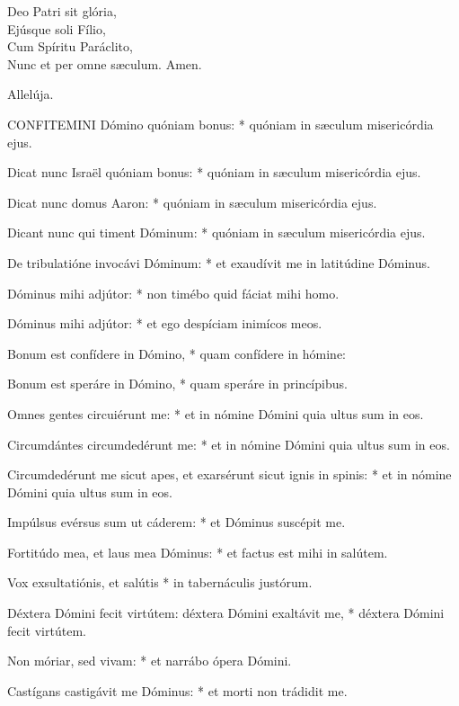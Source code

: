 Deo Patri sit glória,\\
Ejúsque soli Fílio,\\
Cum Spíritu Paráclito,\\
Nunc et per omne sæculum. Amen.

 Allelúja.



\lettrine[lines=2]{C}{ONFITEMINI} Dómino quóniam bonus: * quóniam in sæculum misericórdia ejus.

Dicat nunc Israël quóniam bonus: * quóniam in sæculum misericórdia ejus.

Dicat nunc domus Aaron: * quóniam in sæculum misericórdia ejus.

Dicant nunc qui timent Dóminum: * quóniam in sæculum misericórdia ejus.

De tribulatióne invocávi Dóminum: * et exaudívit me in latitúdine Dóminus.

Dóminus mihi adjútor: * non timébo quid fáciat mihi homo.

Dóminus mihi adjútor: * et ego despíciam inimícos meos.

Bonum est confídere in Dómino, * quam confídere in hómine:

Bonum est speráre in Dómino, * quam speráre in princípibus.

Omnes gentes circuiérunt me: * et in nómine Dómini quia ultus sum in eos.

Circumdántes circumdedérunt me: * et in nómine Dómini quia ultus sum in eos.

Circumdedérunt me sicut apes, et exarsérunt sicut ignis in spinis: * et in nómine Dómini quia ultus sum in eos.

Impúlsus evérsus sum ut cáderem: * et Dóminus suscépit me.

Fortitúdo mea, et laus mea Dóminus: * et factus est mihi in salútem.

Vox exsultatiónis, et salútis * in tabernáculis justórum.

Déxtera Dómini fecit virtútem: déxtera Dómini exaltávit me, * déxtera Dómini fecit virtútem.

Non móriar, sed vivam: * et narrábo ópera Dómini.

Castígans castigávit me Dóminus: * et morti non trádidit me.

